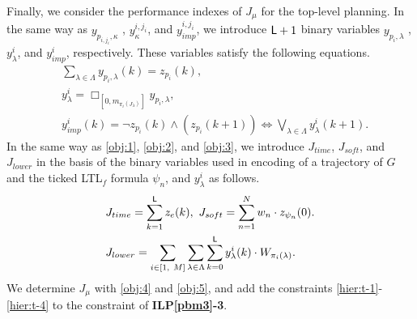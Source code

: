 \documentclass[journal,twoside,web]{IEEEtran}
\newcommand{\req}[1]{\eqref{#1}}
\newcommand{\Len}{{\sf L}}
\newcommand{\G}[1]{\Box_{[#1]}}
\begin{document}
\begin{comment}

Then, we introduce the objective function $J_{\lambda}$ for $G_i$ with ${z}^{i,{j_i}}_\kappa$ as follows.
\begin{align}
J_{\lambda}=&
-\lambda_1\sum_{k=1}^{\Len_i}z_e(k) 
\notag\\&~
+
{\lambda_2}\left(\sum_{j_i\in[1,~M_i]} \sum_{\kappa\in K} \sum_{k=0}^{\Len_i} {y}^{i,{j_i}}_\kappa(k) \cdot {W_{\pi_{i,{j_i}}(J_\kappa)}}\right)
\notag\\&~
+
(1-{\lambda_1}-{\lambda_2})\left(\sum_{n=1}^{N_i} w^i_{n}\cdot z_{\psi^i_{n}}(0)\right) ,\notag
\end{align}
where $\Psi_i=\{(\psi^i_n,w_n^i)|~n\in[1,N_i]\}$ is a set of $N_i$ pairs of soft constraint and its weight for $G_i$.
%
%


\end{comment}

%
Finally, we consider the performance indexes of $J_\mu$ for the top-level planning.
In the same way as $y_{p_{i,{j_i}},\kappa}$ , ${y}^{i,j_i}_{\kappa}$, and $y^{i,j_i}_{{imp}}$, we introduce  $\Len + 1$ binary variables $y_{p_{i},\lambda}$ , ${y}^{i}_{\lambda}$, and $y^{i}_{{imp}}$, respectively.
These variables satisfy the following equations.
\begin{align}
%
&\sum_{\lambda\in \Lambda}{y}_{p_{i},\lambda}(k)= z_{p_{i}}(k), \label{hier:t-1}\\
%
%
&y^{i}_{\lambda}
=\G{0,m_{\pi_{i}(J_\lambda)}} y_{p_{i},\lambda},\label{hier:t-3}\\
&y^{i}_{{imp}}(k) = \lnot z_{p_{i}}(k)\land (z_{p_{i}}(k+1)) \Leftrightarrow\bigvee_{\lambda\in \Lambda} {y}^{i}_{\lambda}(k+1).\label{hier:t-4}
\end{align}
%
In the same way as \req{obj:1}, \req{obj:2}, and \req{obj:3}, we introduce $J_{time}$, $J_{soft}$, and $J_{lower}$ in the basis of the binary variables used in encoding of a trajectory of $G$ and the ticked LTL${}_f$ formula $\psi_n$, and $y^i_\lambda$ as follows.
\begin{align}\label{obj:4}
&J_{time}=\sum_{k=1}^{\Len}z_e(k),
~J_{soft}=\sum_{n=1}^{N} w_{n}\cdot z_{\psi_{n}}(0).\\
&J_{lower}=\sum_{i\in[1,~M]} \sum_{\lambda\in\Lambda} \sum_{k=0}^{\Len} {y}^i_\lambda
(k) \cdot W_{\pi_i(\lambda)}.\label{obj:5}
\end{align}
%
We determine $J_\mu$ with \req{obj:4} and \req{obj:5}, and add the constraints \req{hier:t-1}-\req{hier:t-4} to the constraint of {\bf ILP\ref{pbm3}-3}.
\end{document}
